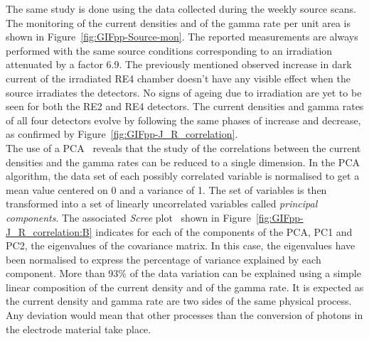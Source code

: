 	The same study is done using the data collected during the weekly source scans. The monitoring of the current densities and of the gamma rate per unit area is shown in Figure~\ref{fig:GIFpp-Source-mon}. The reported measurements are always performed with the same source conditions corresponding to an irradiation attenuated by a factor 6.9. The previously mentioned observed increase in dark current of the irradiated RE4 chamber doesn't have any visible effect when the source irradiates the detectors. No signs of ageing due to irradiation are yet to be seen for both the RE2 and RE4 detectors. The current densities and gamma rates of all four detectors evolve by following the same phases of increase and decrease, as confirmed by Figure~\ref{fig:GIFpp-J_R_correlation}.\\
	The use of a \acf{PCA}~\cite{PCA} reveals that the study of the correlations between the current densities and the gamma rates can be reduced to a single dimension. In the PCA algorithm, the data set of each possibly correlated variable is normalised to get a mean value centered on 0 and a variance of 1. The set of variables is then transformed into a set of linearly uncorrelated variables called \textit{principal components}. The associated \textit{Scree} plot~\cite{SCREE} shown in Figure~\ref{fig:GIFpp-J_R_correlation:B} indicates for each of the components of the PCA, PC1 and PC2, the eigenvalues of the covariance matrix. In this case, the eigenvalues have been normalised to express the percentage of variance explained by each component. More than 93\% of the data variation can be explained using a simple linear composition of the current density and of the gamma rate. It is expected as the current density and gamma rate are two sides of the same physical process. Any deviation would mean that other processes than the conversion of photons in the electrode material take place.

